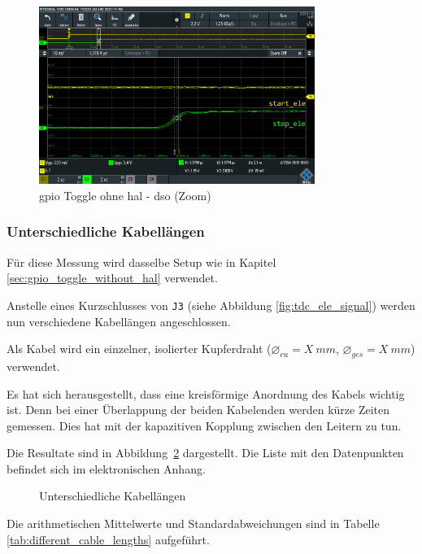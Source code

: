 \begin{figure}[H]
    \centering
    \includegraphics[width=0.8\textwidth]{graphics/gpio_toggle_without_hal_dso_zoom.png}
    \caption{\acrshort{gpio} Toggle ohne \acrshort{hal} - \acrshort{dso} (Zoom)}\label{fig:gpio_toggle_without_hal_dso_zoom}
\end{figure}

\subsubsection{Unterschiedliche Kabellängen}\label{sec:different_cable_lengths}

Für diese Messung wird dasselbe Setup wie in Kapitel \ref{sec:gpio_toggle_without_hal} verwendet.

Anstelle eines Kurzschlusses von \lstinline|J3| (siehe Abbildung \ref{fig:tdc_ele_signal}) werden nun verschiedene
Kabellängen angeschlossen.

Als Kabel wird ein einzelner, isolierter Kupferdraht ($\diameter_{cu} = X~mm$, $\diameter_{ges} = X~mm$) verwendet.

Es hat sich herausgestellt, dass eine kreisförmige Anordnung des Kabels wichtig ist. Denn bei einer Überlappung der
beiden Kabelenden werden kürze Zeiten gemessen. Dies hat mit der kapazitiven Kopplung zwischen den Leitern zu tun.

Die Resultate sind in Abbildung~\ref{fig:different_cable_lengths} dargestellt. Die Liste mit den Datenpunkten befindet
sich im elektronischen Anhang.

\begin{figure}[H]
    \centering
    
    \caption{Unterschiedliche Kabellängen}\label{fig:different_cable_lengths}
\end{figure}

Die arithmetischen Mittelwerte und Standardabweichungen sind in Tabelle \ref{tab:different_cable_lengths} aufgeführt.

